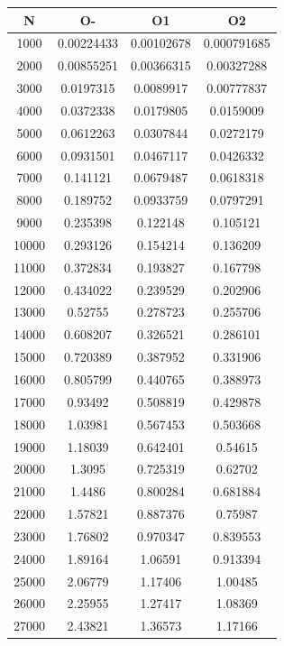 \begin{center}
\begin{tabular}{| c | c | c | c |}
\hline
\textbf{N} & \textbf{O-} & \textbf{O1} & \textbf{O2} \\ \hline
1000 & 0.00224433 & 0.00102678 & 0.000791685 \\ \hline
2000 & 0.00855251 & 0.00366315 & 0.00327288 \\ \hline
3000 & 0.0197315 & 0.0089917 & 0.00777837 \\ \hline
4000 & 0.0372338 & 0.0179805 & 0.0159009 \\ \hline
5000 & 0.0612263 & 0.0307844 & 0.0272179 \\ \hline
6000 & 0.0931501 & 0.0467117 & 0.0426332 \\ \hline
7000 & 0.141121 & 0.0679487 & 0.0618318 \\ \hline
8000 & 0.189752 & 0.0933759 & 0.0797291 \\ \hline
9000 & 0.235398 & 0.122148 & 0.105121 \\ \hline
10000 & 0.293126 & 0.154214 & 0.136209 \\ \hline
11000 & 0.372834 & 0.193827 & 0.167798 \\ \hline
12000 & 0.434022 & 0.239529 & 0.202906 \\ \hline
13000 & 0.52755 & 0.278723 & 0.255706 \\ \hline
14000 & 0.608207 & 0.326521 & 0.286101 \\ \hline
15000 & 0.720389 & 0.387952 & 0.331906 \\ \hline
16000 & 0.805799 & 0.440765 & 0.388973 \\ \hline
17000 & 0.93492 & 0.508819 & 0.429878 \\ \hline
18000 & 1.03981 & 0.567453 & 0.503668 \\ \hline
19000 & 1.18039 & 0.642401 & 0.54615 \\ \hline
20000 & 1.3095 & 0.725319 & 0.62702 \\ \hline
21000 & 1.4486 & 0.800284 & 0.681884 \\ \hline
22000 & 1.57821 & 0.887376 & 0.75987 \\ \hline
23000 & 1.76802 & 0.970347 & 0.839553 \\ \hline
24000 & 1.89164 & 1.06591 & 0.913394 \\ \hline
25000 & 2.06779 & 1.17406 & 1.00485 \\ \hline
26000 & 2.25955 & 1.27417 & 1.08369 \\ \hline
27000 & 2.43821 & 1.36573 & 1.17166 \\ \hline

\end{tabular}
\end{center}
